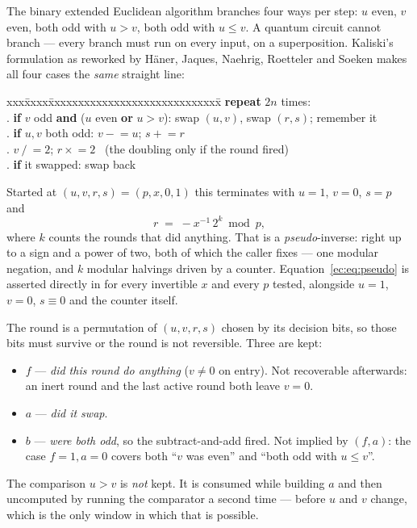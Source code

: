 The binary extended Euclidean algorithm branches four ways per step: $u$ even, $v$ even, both odd
with $u>v$, both odd with $u\le v$. A quantum circuit cannot branch --- every branch must run on
every input, on a superposition. Kaliski's formulation as reworked by H\"aner, Jaques, Naehrig,
Roetteler and Soeken \cite{ec:hjnrs20} makes all four cases the \emph{same} straight line:

\begin{center}\small
\begin{minipage}{0.86\textwidth}
\begin{tabbing}
xxx\=xxxx\=xxxxxxxxxxxxxxxxxxxxxxxxxxxxx\=\kill
\> \textbf{repeat} $2n$ times:\\
.\> \textbf{if} $v$ odd \textbf{and} ($u$ even \textbf{or} $u>v$): \> swap $(u,v)$, swap $(r,s)$; remember it\\
.\> \textbf{if} $u,v$ both odd: \> $v \mathrel{-}= u$; \quad $s \mathrel{+}= r$\\
.\> \> $v \mathrel{/}= 2$; \quad $r \mathrel{\times}= 2$ \ (the doubling only if the round fired)\\
.\> \textbf{if} it swapped: \> swap back
\end{tabbing}
\end{minipage}
\end{center}

\noindent
Started at $(u,v,r,s)=(p,x,0,1)$ this terminates with $u=1$, $v=0$, $s=p$ and
\begin{equation}\label{ec:eq:pseudo}
r \;=\; -x^{-1}\,2^{k} \bmod p,
\end{equation}
where $k$ counts the rounds that did anything. That is a \emph{pseudo}-inverse: right up to a sign
and a power of two, both of which the caller fixes --- one modular negation, and $k$ modular
halvings driven by a counter. Equation~\eqref{ec:eq:pseudo} is asserted directly in
 for every invertible $x$ and every $p$ tested, alongside
$u=1$, $v=0$, $s\equiv0$ and the counter itself.

\begin{keybox}[title={Three bits per round, and why none can be dropped}]
The round is a permutation of $(u,v,r,s)$ chosen by its decision bits, so those bits must survive
or the round is not reversible. Three are kept:
\begin{itemize}\setlength\itemsep{1pt}
\item $f$ --- \emph{did this round do anything} ($v\neq0$ on entry). Not recoverable afterwards: an
inert round and the last active round both leave $v=0$.
\item $a$ --- \emph{did it swap}.
\item $b$ --- \emph{were both odd}, so the subtract-and-add fired. Not implied by $(f,a)$: the case
$f=1,a=0$ covers both ``$v$ was even'' and ``both odd with $u\le v$''.
\end{itemize}
The comparison $u>v$ is \emph{not} kept. It is consumed while building $a$ and then uncomputed by
running the comparator a second time --- before $u$ and $v$ change, which is the only window in
which that is possible.
\end{keybox}

